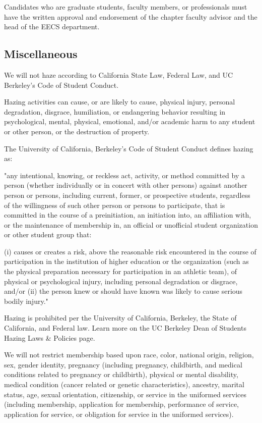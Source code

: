 \documentclass[11pt]{article}
\begin{document}
Candidates who are graduate students, faculty members, or professionals must have the written approval and endorsement of the chapter faculty advisor and the head of the EECS department.

\subsection{Miscellaneous}
\label{sec:org3ce64dc}

We will not haze according to California State Law, Federal Law, and UC Berkeley's Code of Student Conduct.

Hazing activities can cause, or are likely to cause, physical injury, personal degradation, disgrace, humiliation, or endangering behavior resulting in psychological, mental, physical, emotional, and/or academic harm to any student or other person, or the destruction of property. 

The University of California, Berkeley’s Code of Student Conduct defines hazing as:

"any intentional, knowing, or reckless act, activity, or method  committed by a person (whether individually or in concert with other persons) against another person or persons, including current, former, or prospective students, regardless of the willingness of such other person or persons to participate, that is committed in the course of a preinitiation, an initiation into, an affiliation with, or the maintenance of membership in, an official or unofficial student organization or other student group that:

(i) causes or creates a risk, above the reasonable risk encountered in the course of participation in the institution of higher education or the organization (such as the physical preparation necessary for participation in an athletic team), of physical or psychological injury, including personal degradation or disgrace, and/or
(ii) the person knew or should have known was likely to cause serious bodily injury."

Hazing is prohibited per the University of California, Berkeley, the State of California, and Federal law. Learn more on the UC Berkeley Dean of Students Hazing Laws \& Policies page.

We will not restrict membership based upon race, color, national origin, religion, sex, gender identity, pregnancy (including pregnancy, childbirth, and medical conditions related to pregnancy or childbirth), physical or mental disability, medical condition (cancer related or genetic characteristics), ancestry, marital status, age, sexual orientation, citizenship, or service in the uniformed services (including membership, application for membership, performance of service, application for service, or obligation for service in the uniformed services).
\end{document}
